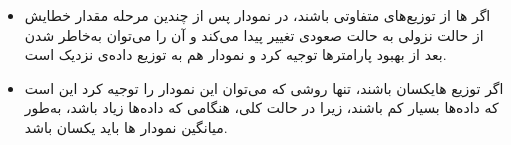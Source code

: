 
\begin{itemize}
	\item اگر ها از توزیع‌های متفاوتی باشند، در نمودار پس از چندین مرحله  مقدار خطایش از حالت نزولی به حالت صعودی تغییر پیدا می‌کند و آن را می‌توان به‌خاطر   شدن بعد از بهبود پارامترها توجیه کرد و نمودار  هم به توزیع داده‌ی  نزدیک است. 

	\item اگر توزیع‌ هایکسان باشند، تنها روشی که می‌توان این نمودار را توجیه کرد این است که داده‌ها بسیار کم باشند، زیرا در حالت کلی، هنگامی که داده‌ها زیاد باشد، به‌طور میانگین نمودار  ها باید یکسان باشد.
\end{itemize}
